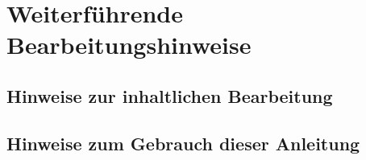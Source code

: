 \chapter{Weiterführende Bearbeitungshinweise}
\label{weitere-hinweise}
\section{Hinweise zur inhaltlichen Bearbeitung}
\label{weitere-hinweise-inhaltliche-bearbeitung}
\section{Hinweise zum Gebrauch dieser Anleitung}
\label{weitere-hinweise-gebrauch-anleitung}

